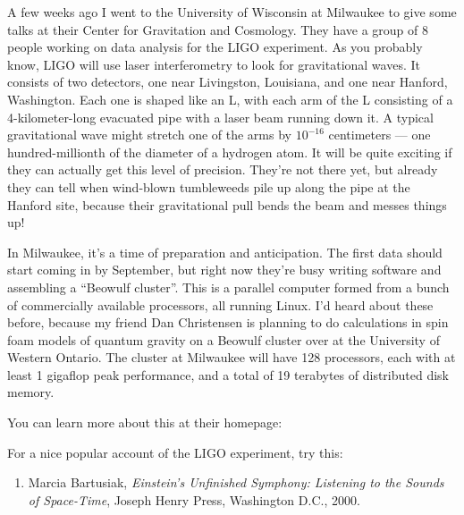 \documentclass{article}
\def\tightlist{}
\renewcommand{\texttt}[1]{%
  \begingroup
  \ttfamily
  \begingroup\lccode`~=`/\lowercase{\endgroup\def~}{/\discretionary{}{}{}}%
  \begingroup\lccode`~=`[\lowercase{\endgroup\def~}{[\discretionary{}{}{}}%
  \begingroup\lccode`~=`.\lowercase{\endgroup\def~}{.\discretionary{}{}{}}%
  \catcode`/=\active\catcode`[=\active\catcode`.=\active
  \scantokens{#1\noexpand}%
  \endgroup
}
\begin{document}
A few weeks ago I went to the University of Wisconsin at Milwaukee to
give some talks at their Center for Gravitation and Cosmology. They have
a group of 8 people working on data analysis for the LIGO experiment. As
you probably know, LIGO will use laser interferometry to look for
gravitational waves. It consists of two detectors, one near Livingston,
Louisiana, and one near Hanford, Washington. Each one is shaped like an
L, with each arm of the L consisting of a 4-kilometer-long evacuated
pipe with a laser beam running down it. A typical gravitational wave
might stretch one of the arms by \(10^{-16}\) centimeters --- one
hundred-millionth of the diameter of a hydrogen atom. It will be quite
exciting if they can actually get this level of precision. They're not
there yet, but already they can tell when wind-blown tumbleweeds pile up
along the pipe at the Hanford site, because their gravitational pull
bends the beam and messes things up!

In Milwaukee, it's a time of preparation and anticipation. The first
data should start coming in by September, but right now they're busy
writing software and assembling a ``Beowulf cluster''. This is a
parallel computer formed from a bunch of commercially available
processors, all running Linux. I'd heard about these before, because my
friend Dan Christensen is planning to do calculations in spin foam
models of quantum gravity on a Beowulf cluster over at the University of
Western Ontario. The cluster at Milwaukee will have 128 processors, each
with at least 1 gigaflop peak performance, and a total of 19 terabytes
of distributed disk memory.

You can learn more about this at their homepage:


For a nice popular account of the LIGO experiment, try this:

\begin{enumerate}
\def\labelenumi{\arabic{enumi})}
\setcounter{enumi}{1}
\tightlist
\item
  Marcia Bartusiak, \emph{Einstein's Unfinished Symphony: Listening to
  the Sounds of Space-Time}, Joseph Henry Press, Washington D.C., 2000.
\end{enumerate}
\end{document}
